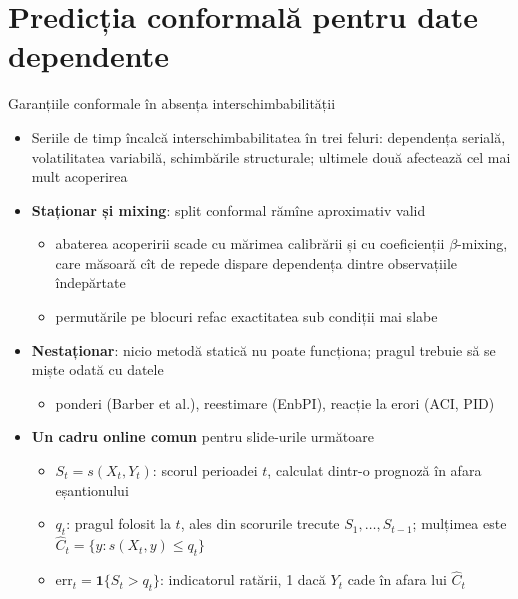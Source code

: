 \section{Predicția conformală pentru date dependente}

\begin{frame}{Garanțiile conformale în absența interschimbabilității}
\itemsize{\small}
\begin{itemize}
    \item Seriile de timp încalcă interschimbabilitatea în trei feluri: dependența serială, volatilitatea variabilă, schimbările structurale; ultimele două afectează cel mai mult acoperirea
    \item \textbf{Staționar și mixing}: split conformal rămîne aproximativ valid 
    \begin{itemize}
        \item abaterea acoperirii scade cu mărimea calibrării și cu coeficienții $\beta$-mixing, care măsoară cît de repede dispare dependența dintre observațiile îndepărtate
        \item permutările pe blocuri refac exactitatea sub condiții mai slabe 
    \end{itemize}
    \item \textbf{Nestaționar}: nicio metodă statică nu poate funcționa; pragul trebuie să se miște odată cu datele
    \begin{itemize}
        \item ponderi (Barber et al.), reestimare (EnbPI), reacție la erori (ACI, PID)
    \end{itemize}
    \item \textbf{Un cadru online comun} pentru slide-urile următoare
    \begin{itemize}
        \item $S_t = s(X_t, Y_t)$: scorul perioadei $t$, calculat dintr-o prognoză în afara eșantionului
        \item $q_t$: pragul folosit la $t$, ales din scorurile trecute $S_1, \dots, S_{t-1}$; mulțimea este $\hat C_t = \{y: s(X_t, y) \le q_t\}$
        \item $\mathrm{err}_t = \mathbf 1\{S_t > q_t\}$: indicatorul ratării, 1 dacă $Y_t$ cade în afara lui $\hat C_t$
    \end{itemize}
\end{itemize}
\end{frame}

